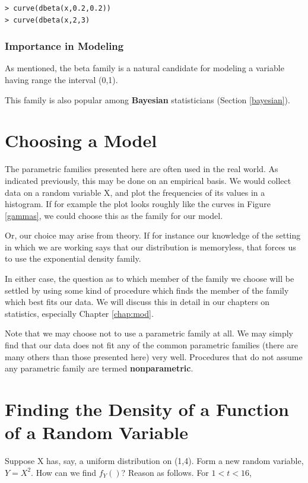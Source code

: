 \begin{lstlisting}
> curve(dbeta(x,0.2,0.2))
> curve(dbeta(x,2,3)
\end{lstlisting}


\subsubsection{Importance in Modeling}

As mentioned, the beta family is a natural candidate for modeling a
variable having range the interval (0,1).

This family is also popular among {\bf Bayesian} statisticians
(Section \ref{bayesian}).

\section{Choosing a Model}

The parametric families presented here are often used in the real world.
As indicated previously, this may be done on an empirical basis.  We
would collect data on a random variable X, and plot the frequencies of
its values in a histogram.  If for example the plot looks roughly like
the curves in Figure \ref{gammas}, we could choose this as the family
for our model.

Or, our choice may arise from theory.  If for instance our knowledge of
the setting in which we are working says that our distribution is
memoryless, that forces us to use the exponential density family.

In either case, the question as to which member of the family we choose
will be settled by using some kind of procedure which finds the
member of the family which best fits our data.  We will discuss this in
detail in our chapters on statistics, especially Chapter \ref{chap:mod}.

Note that we may choose not to use a parametric family at all.  We may
simply find that our data does not fit any of the common parametric
families (there are many others than those presented here) very well.
Procedures that do not assume any parametric family are termed {\bf
nonparametric}.

\section{Finding the Density of a Function of a Random Variable}
\label{densgofx}

Suppose X has, say, a uniform distribution on (1,4).  Form a new random
variable, $Y = X^2$.  How can we find $f_Y()$?  Reason as follows.  For
$1 < t < 16$,


